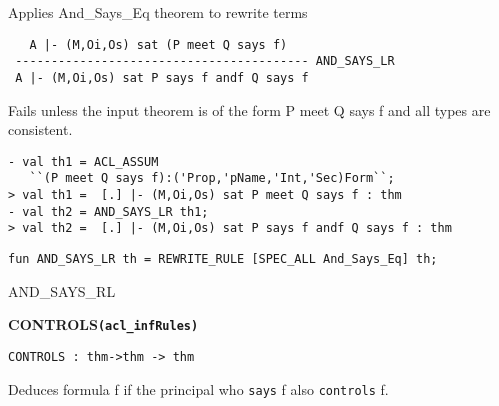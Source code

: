 \SYNOPSIS
Applies And_Says_Eq theorem to rewrite terms

\DESCRIBE

\begin{verbatim}
   A |- (M,Oi,Os) sat (P meet Q says f)
 ----------------------------------------- AND_SAYS_LR
 A |- (M,Oi,Os) sat P says f andf Q says f
\end{verbatim}

\FAILURE 
Fails unless the input theorem is of the form P meet Q says f and all
types are consistent.

\EXAMPLE
\begin{holboxed}
\begin{verbatim}
- val th1 = ACL_ASSUM 
   ``(P meet Q says f):('Prop,'pName,'Int,'Sec)Form``;
> val th1 =  [.] |- (M,Oi,Os) sat P meet Q says f : thm
- val th2 = AND_SAYS_LR th1;
> val th2 =  [.] |- (M,Oi,Os) sat P says f andf Q says f : thm
\end{verbatim}
\end{holboxed}
\IMPLEMENTATION
\begin{holboxed}
\begin{verbatim}
fun AND_SAYS_LR th = REWRITE_RULE [SPEC_ALL And_Says_Eq] th;
\end{verbatim}
\end{holboxed}

\SEEALSO
AND\_SAYS\_RL
\ENDDOC

\begin{holboxed}
  \begin{Large}
    \textbf{\Large{CONTROLS}}\hfill{}\texttt{\textbf{(acl\_infRules)}}
  \end{Large}
\end{holboxed}

\begin{verbatim}
CONTROLS : thm->thm -> thm
\end{verbatim}


\SYNOPSIS Deduces formula f if the principal who \texttt{says} f also
\texttt{controls} f.

